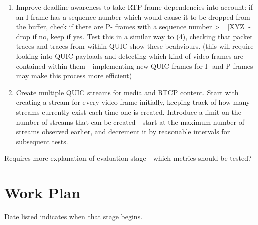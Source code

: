 \documentclass{mprop}
\begin{document}
\begin{enumerate}
  \item Improve deadline awareness to take RTP frame dependencies into account: if an I-frame has 
  a sequence number which would cause it to be dropped from the buffer, check if there are P-
  frames with a sequence number >= [XYZ] - drop if no, keep if yes. Test this in a similar way to 
  (4), checking that packet traces and traces from within QUIC show these beahviours. (this will 
  require looking into QUIC payloads and detecting which kind of video frames are contained 
  within them - implementing new QUIC frames for I- and P-frames may make this process more 
  efficient)

  \item Create multiple QUIC streams for media and RTCP content. Start with creating a stream for 
  every video frame initially, keeping track of how many streams currently exist each time one is 
  created. Introduce a limit on the number of streams that can be created - start at the maximum 
  number of streams observed earlier, and decrement it by reasonable intervals for subsequent 
  tests.
\end{enumerate}

Requires more explanation of evaluation stage - which metrics should be tested?

\newpage

\section{Work Plan}


Date listed indicates when that stage begins.
\end{document}
